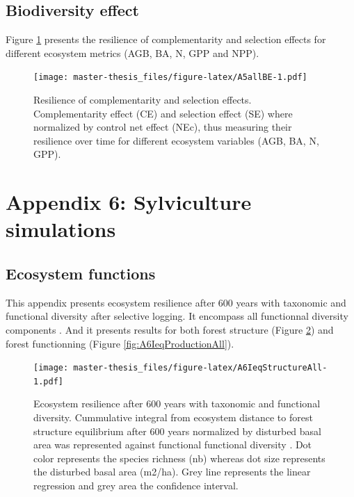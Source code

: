 \documentclass[12pt,]{article}
\let\oldsection\section
\renewcommand\section{\newpage\oldsection}
\theoremstyle{definition}
\theoremstyle{definition}
\theoremstyle{remark}
\begin{document}
\subsection{Biodiversity effect}\label{biodiversity-effect-2}

Figure \ref{fig:A5allBE} presents the resilience of complementarity and
selection effects for different ecosystem metrics (AGB, BA, N, GPP and
NPP).

\begin{figure}[htbp]
\centering
\texttt{[image: master-thesis\_files/figure-latex/A5allBE-1.pdf]}
\caption{\label{fig:A5allBE}Resilience of complementarity and selection
effects. Complementarity effect (CE) and selection effect (SE) where
normalized by control net effect (NEc), thus measuring their resilience
over time for different ecosystem variables (AGB, BA, N, GPP).}
\end{figure}

\hypertarget{appendix-6-sylviculture-simulations}{\section{Appendix 6:
Sylviculture simulations}\label{appendix-6-sylviculture-simulations}}

\subsection{Ecosystem functions}\label{ecosystem-functions-3}

This appendix presents ecosystem resilience after 600 years with
taxonomic and functional diversity after selective logging. It encompass
all functionnal diversity components \citep[FRIC, FEve, FDiv, and
FDis,][]{villeger_new_2008}. And it presents results for both forest
structure (Figure \ref{fig:A6IeqStructureAll}) and forest functionning
(Figure \ref{fig:A6IeqProductionAll}).

\begin{figure}[htbp]
\centering
\texttt{[image: master-thesis\_files/figure-latex/A6IeqStructureAll-1.pdf]}
\caption{\label{fig:A6IeqStructureAll}Ecosystem resilience after 600 years
with taxonomic and functional diversity. Cummulative integral from
ecosystem distance to forest structure equilibrium after 600 years
normalized by disturbed basal area was represented against functional
functional diversity \citep[FRIC, FEve, FDiv, and
FDis,][]{villeger_new_2008}. Dot color represents the species richness
(nb) whereas dot size represents the disturbed basal area (m2/ha). Grey
line represents the linear regression and grey area the confidence
interval.}
\end{figure}
\end{document}
